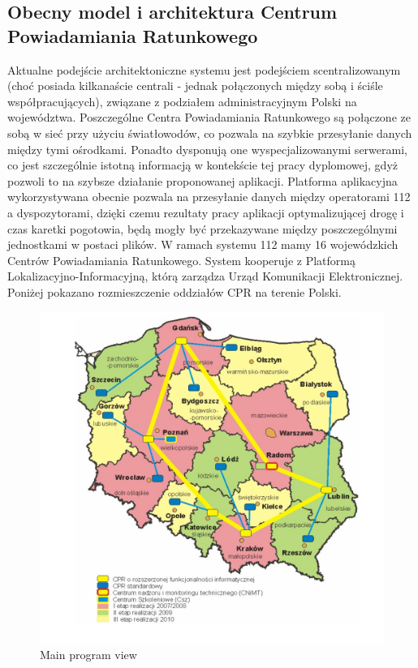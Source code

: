 \documentclass[12pt]{article} %
\begin{document}
\subsection{Obecny model i architektura Centrum Powiadamiania Ratunkowego}
Aktualne podejście architektoniczne systemu jest podejściem scentralizowanym (choć posiada kilkanaście centrali - jednak połączonych między sobą i ściśle współpracujących), związane z podziałem administracyjnym Polski na województwa. Poszczególne Centra  Powiadamiania Ratunkowego są połączone ze sobą w sieć przy użyciu światłowodów, co pozwala na szybkie przesyłanie danych między tymi ośrodkami. Ponadto dysponują one
wyspecjalizowanymi serwerami, co jest szczególnie istotną informacją w kontekście tej pracy dyplomowej, gdyż pozwoli to na szybsze działanie proponowanej aplikacji. Platforma aplikacyjna wykorzystywana obecnie pozwala na przesyłanie danych między operatorami 112 a dyspozytorami, dzięki czemu rezultaty pracy aplikacji optymalizującej drogę i czas karetki pogotowia, będą mogły być przekazywane między poszczególnymi jednostkami w postaci plików.
W ramach systemu 112 mamy 16 wojewódzkich Centrów Powiadamiania Ratunkowego. System kooperuje z Platformą Lokalizacyjno-Informacyjną, którą zarządza Urząd Komunikacji Elektronicznej. Poniżej pokazano rozmieszczenie oddziałów CPR na terenie Polski.

\begin{figure}[H]
  \centering
  \includegraphics[width=\columnwidth]{images/mapa_cpr.png}
  \caption{Main program view }
\end{figure}
\end{document}
